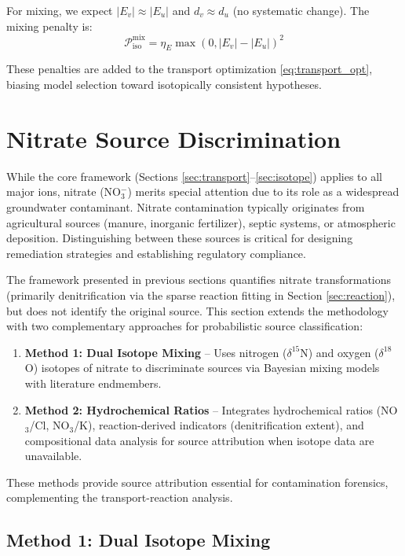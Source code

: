 \documentclass[12pt,a4paper]{article}
\theoremstyle{plain}
\theoremstyle{definition}
\theoremstyle{remark}
\begin{document}
For mixing, we expect $|E_v| \approx |E_u|$ and $d_v \approx d_u$ (no systematic change). The mixing penalty is:
\begin{equation}\label{eq:iso_penalty_mix}
	\mathcal{P}_{\text{iso}}^{\text{mix}} = \eta_E \max(0, |E_v| - |E_u|)^2
\end{equation}

These penalties are added to the transport optimization \eqref{eq:transport_opt}, biasing model selection toward isotopically consistent hypotheses.
\newpage
\section{Nitrate Source Discrimination}\label{sec:nitrate}

While the core framework (Sections \ref{sec:transport}--\ref{sec:isotope}) applies to all major ions, nitrate (NO$_3^-$) merits special attention due to its role as a widespread groundwater contaminant. Nitrate contamination typically originates from agricultural sources (manure, inorganic fertilizer), septic systems, or atmospheric deposition. Distinguishing between these sources is critical for designing remediation strategies and establishing regulatory compliance.

The framework presented in previous sections quantifies nitrate transformations (primarily denitrification via the sparse reaction fitting in Section \ref{sec:reaction}), but does not identify the original source. This section extends the methodology with two complementary approaches for probabilistic source classification:

\begin{enumerate}
	\item \textbf{Method 1: Dual Isotope Mixing} -- Uses nitrogen ($\delta^{15}$N) and oxygen ($\delta^{18}$O) isotopes of nitrate to discriminate sources via Bayesian mixing models with literature endmembers.
	\item \textbf{Method 2: Hydrochemical Ratios} -- Integrates hydrochemical ratios (NO$_3$/Cl, NO$_3$/K), reaction-derived indicators (denitrification extent), and compositional data analysis for source attribution when isotope data are unavailable.
\end{enumerate}

These methods provide source attribution essential for contamination forensics, complementing the transport-reaction analysis.

\subsection{Method 1: Dual Isotope Mixing}
\end{document}
